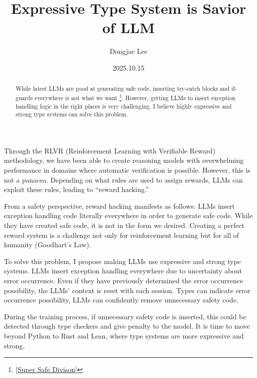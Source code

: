 \documentclass[11pt, oneside]{article}   	%
\title{Expressive Type System is Savior of LLM}
\author{Dongjae Lee}
\date{2025.10.15}
\begin{document}
\maketitle


\begin{abstract}
	While latest LLMs are good at generating safe code, inserting try-catch blocks and if-guards everywhere is not what we want \footnote{[\href{https://x.com/karpathy/status/1976082963382272334/photo/1}{Super Safe Divison}]}.
	However, getting LLMs to insert exception handling logic in the right places is very challenging.
	I believe highly expressive and strong type systems can solve this problem.
\end{abstract}

Through the RLVR (Reinforcement Learning with Verifiable Reward) methodology,
we have been able to create reasoning models with overwhelming performance in domains where automatic verification is possible.
However, this is not a panacea.
Depending on what rules are used to assign rewards, LLMs can exploit these rules, leading to ``reward hacking.''

From a safety perspective, reward hacking manifests as follows: LLMs insert exception handling code literally everywhere in order to generate safe code.
While they have created safe code, it is not in the form we desired.
Creating a perfect reward system is a challenge not only for reinforcement learning but for all of humanity (Goodhart's Law).

To solve this problem, I propose making LLMs use expressive and strong type systems.
LLMs insert exception handling everywhere due to uncertainty about error occurrence.
Even if they have previously determined the error occurrence possibility, the LLMs' context is reset with each session.
Types can indicate error occurrence possibility, LLMs can confidently remove unnecessary safety code.

During the training process, if unnecessary safety code is inserted, this could be detected through type checkers and give penalty to the model.
It is time to move beyond Python to Rust and Lean, where type systems are more expressive and strong.
\end{document}

